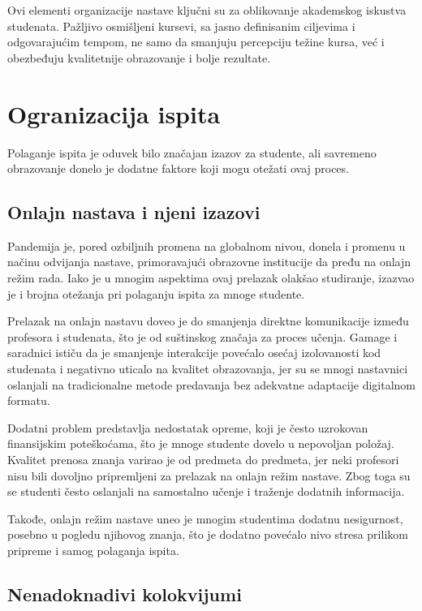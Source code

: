 \documentclass[a4paper]{article}
\begin{document}
Ovi elementi organizacije nastave ključni su za oblikovanje akademskog iskustva studenata.
Pažljivo osmišljeni kursevi, sa jasno definisanim ciljevima i odgovarajućim tempom, ne samo
da smanjuju percepciju težine kursa, već i obezbeđuju kvalitetnije obrazovanje i bolje
rezultate.

\section{Ogranizacija ispita}

Polaganje ispita je oduvek bilo značajan izazov za studente, ali savremeno obrazovanje donelo je dodatne faktore koji mogu otežati ovaj proces.

\subsection{Onlajn nastava i njeni izazovi}

Pandemija je, pored ozbiljnih promena na globalnom nivou, donela i promenu u načinu odvijanja nastave, primoravajući obrazovne institucije da pređu na onlajn režim rada. Iako je u mnogim aspektima ovaj prelazak olakšao studiranje, izazvao je i brojna otežanja pri polaganju ispita za mnoge studente.

Prelazak na onlajn nastavu doveo je do smanjenja direktne komunikacije između profesora i studenata, što je od suštinskog značaja za proces učenja. Gamage i saradnici \cite{gamage2022rethinking} ističu da je smanjenje interakcije povećalo osećaj izolovanosti kod studenata i negativno uticalo na kvalitet obrazovanja, jer su se mnogi nastavnici oslanjali na tradicionalne metode predavanja bez adekvatne adaptacije digitalnom formatu.

Dodatni problem predstavlja nedostatak opreme, koji je često uzrokovan finansijskim poteškoćama, što je mnoge studente dovelo u nepovoljan položaj. Kvalitet prenosa znanja varirao je od predmeta do predmeta, jer neki profesori nisu bili dovoljno pripremljeni za prelazak na onlajn režim nastave. Zbog toga su se studenti često oslanjali na samostalno učenje i traženje dodatnih informacija.

Takođe, onlajn režim nastave uneo je mnogim studentima dodatnu nesigurnost, posebno u pogledu njihovog znanja, što je dodatno povećalo nivo stresa prilikom pripreme i samog polaganja ispita.

\subsection{Nenadoknadivi kolokvijumi}
\end{document}
